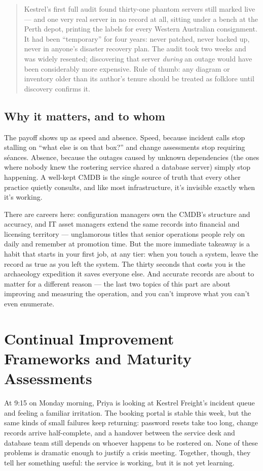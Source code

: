 \begin{quote}\small
Kestrel's first full audit found thirty-one phantom servers still marked live — and one very real server in no record at all, sitting under a bench at the Perth depot, printing the labels for every Western Australian consignment. It had been ``temporary'' for four years: never patched, never backed up, never in anyone's disaster recovery plan. The audit took two weeks and was widely resented; discovering that server \emph{during} an outage would have been considerably more expensive. Rule of thumb: any diagram or inventory older than its author's tenure should be treated as folklore until discovery confirms it.
\end{quote}



\subsection{Why it matters, and to whom}


The payoff shows up as speed and absence. Speed, because incident calls stop stalling on ``what else is on that box?'' and change assessments stop requiring séances. Absence, because the outages caused by unknown dependencies (the ones where nobody knew the rostering service shared a database server) simply stop happening. A well-kept CMDB is the single source of truth that every other practice quietly consults, and like most infrastructure, it's invisible exactly when it's working.


There are careers here: configuration managers own the CMDB's structure and accuracy, and IT asset managers extend the same records into financial and licensing territory — unglamorous titles that senior operations people rely on daily and remember at promotion time. But the more immediate takeaway is a habit that starts in your first job, at any tier: when you touch a system, leave the record as true as you left the system. The thirty seconds that costs you is the archaeology expedition it saves everyone else. And accurate records are about to matter for a different reason — the last two topics of this part are about improving and measuring the operation, and you can't improve what you can't even enumerate.

\section{Continual Improvement Frameworks and Maturity Assessments}
At 9:15 on Monday morning, Priya is looking at Kestrel Freight's incident queue and feeling a familiar irritation. The booking portal is stable this week, but the same kinds of small failures keep returning: password resets take too long, change records arrive half-complete, and a handover between the service desk and database team still depends on whoever happens to be rostered on. None of these problems is dramatic enough to justify a crisis meeting. Together, though, they tell her something useful: the service is working, but it is not yet learning.



